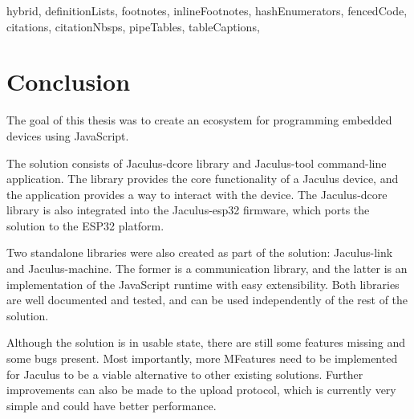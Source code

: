 \begin{markdown*}{%
  hybrid,
  definitionLists,
  footnotes,
  inlineFootnotes,
  hashEnumerators,
  fencedCode,
  citations,
  citationNbsps,
  pipeTables,
  tableCaptions,
}
\chapter{Conclusion}

The goal of this thesis was to create an ecosystem for programming embedded devices using JavaScript.

The solution consists of Jaculus-dcore library and Jaculus-tool command-line application. The library provides the core functionality of a Jaculus device, and the application provides a way to interact with the device. The Jaculus-dcore library is also integrated into the Jaculus-esp32 firmware, which ports the solution to the ESP32 platform.

Two standalone libraries were also created as part of the solution: Jaculus-link and Jaculus-machine. The former is a communication library, and the latter is an implementation of the JavaScript runtime with easy extensibility. Both libraries are well documented and tested, and can be used independently of the rest of the solution.

Although the solution is in usable state, there are still some features missing and some bugs present. Most importantly, more MFeatures need to be implemented for Jaculus to be a viable alternative to other existing solutions. Further improvements can also be made to the upload protocol, which is currently very simple and could have better performance.

\end{markdown*}
